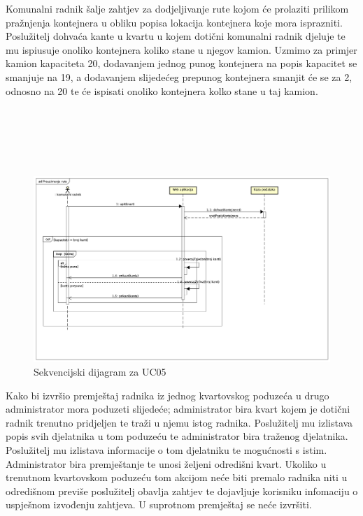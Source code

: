 				
				
				
				
				Komunalni radnik šalje zahtjev za dodjeljivanje rute kojom će prolaziti prilikom pražnjenja kontejnera u obliku popisa lokacija kontejnera koje mora isprazniti. Poslužitelj dohvaća kante u kvartu u kojem dotični komunalni radnik djeluje te mu ispiusuje onoliko kontejnera koliko stane u njegov kamion. Uzmimo za primjer kamion kapaciteta 20, dodavanjem jednog punog kontejnera na popis kapacitet se smanjuje na 19, a dodavanjem slijedećeg prepunog kontejnera smanjit će se za 2, odnosno na 20 te će ispisati onoliko kontejnera kolko stane u taj kamion.\\\\\\\\\\\\
				
				\begin{figure}[H]
					\includegraphics[scale=0.4]{figures/pravo_Preuzimanje_rute.PNG}
					\centering
					\caption{Sekvencijski dijagram za UC05}
					\label{fig:sekv-uc05}
				\end{figure}
			
							
								
				
				
				
				
				
				
				Kako bi izvršio premještaj radnika iz jednog kvartovskog poduzeća u drugo administrator mora poduzeti slijedeće; administrator bira kvart kojem je dotični radnik trenutno pridjeljen te traži u njemu istog radnika. Poslužitelj mu izlistava popis svih djelatnika u tom poduzeću te administrator bira traženog djelatnika. Poslužitelj mu izlistava informacije o tom djelatniku te mogućnosti s istim. Administrator bira premještanje te unosi željeni odredišni kvart. Ukoliko u trenutnom kvartovskom poduzeću tom akcijom neće biti premalo radnika niti u odredišnom previše poslužitelj obavlja zahtjev te dojavljuje korisniku infomaciju o uspješnom izvođenju zahtjeva. U suprotnom premještaj se neće izvršiti. \\\\
				
